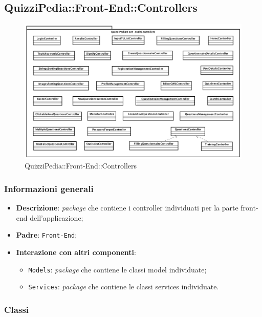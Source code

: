 \newpage
\subsection{QuizziPedia::Front-End::Controllers}


\begin{figure} [ht]
	\centering
	\includegraphics[scale=0.42]{UML/Package/QuizziPedia_Front-End_Controllers.png}
	\caption{QuizziPedia::Front-End::Controllers}
\end{figure} \FloatBarrier

\subsubsection{Informazioni generali}
\begin{itemize}
	\item \textbf{Descrizione}: \textit{package} che contiene i controller individuati per la parte front-end dell'applicazione;
	\item \textbf{Padre}: \texttt{Front-End};
	\item \textbf{Interazione con altri componenti}:
	\begin{itemize}
		\item \texttt{Models}: \textit{package} che contiene le classi model individuate;
		\item \texttt{Services}: \textit{package} che contiene le classi services individuate.
	\end{itemize} 
\end{itemize}
\subsubsection{Classi}

